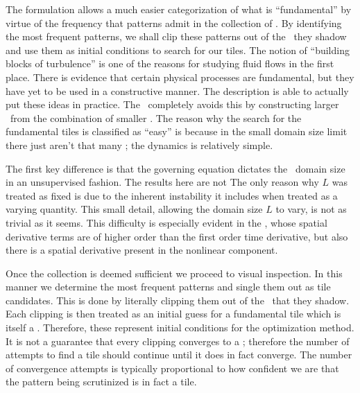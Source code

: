 The {\spt} formulation allows a much easier categorization of what is
``fundamental'' by virtue of the frequency that patterns admit in the
collection of \twots. By identifying the most frequent patterns, we shall
clip these patterns out of the \twots\ they shadow and use them as initial
conditions to search for our tiles.
The notion of ``building blocks of turbulence'' is one of the reasons for
studying fluid flows in the first place. There is evidence that certain
physical processes are fundamental, but they have yet to be used in a
constructive manner. The {\spt} description is able to actually put
these ideas in practice.
The \spt\ completely avoids this by constructing larger \twots\
from the combination of smaller \twots.
The reason
why the search for the fundamental tiles is classified as ``easy'' is because
in the small domain size limit there just aren't that many \twots; the dynamics
is relatively simple.

The first key difference is that the governing equation
dictates the \spt\ domain size in an unsupervised
fashion. The results here are not
The only reason why $L$ was treated as fixed is due to the
inherent instability it includes when treated as a varying quantity.
This small detail, allowing the domain size $L$ to vary,
is not as trivial as it seems.
 This difficulty
is especially evident in the \KSe, whose spatial derivative terms
are of higher order than the first order time derivative, but also
there is a spatial derivative present in the nonlinear component.



Once the collection is deemed sufficient we proceed to visual inspection. In this manner
we determine the most frequent patterns and single them out as tile candidates. This is
done by literally clipping them out of the \twots\ that they shadow. Each clipping is
then treated as an initial guess for a fundamental tile which is itself a \twot. Therefore,
these represent initial conditions for the optimization method. It is not a guarantee
that every clipping converges to a \twot; therefore the number of attempts to find a tile
should continue until it does in fact converge. The number of convergence attempts is typically
proportional to how confident we are that the pattern being scrutinized is in fact a tile.

